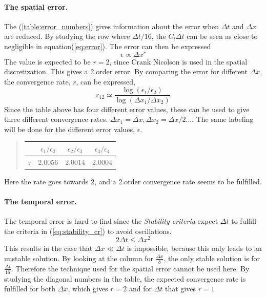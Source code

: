 \documentclass[%
twoside,                 %
final,                   %
10pt]{article}
\begin{document}
\noindent

\paragraph{The spatial error.}
The (\ref{table:error_numbers}) gives information about the error when $\Delta t$ and $\Delta x$ are reduced. By studying the row where $\Delta t/16$, the $C_t \Delta t$ can be seen as close to negligible in equation(\ref{eq:error}). The error can then be expressed 
\begin{equation}
    \epsilon \propto \Delta x^r
\end{equation}
The value is expected to be $r=2$, since Crank Nicolson is used in the spatial discretization. This gives a 2.order error. By comparing the error for different $\Delta x$, the convergence rate, $r$, can be expressed, 
\begin{equation} \label{eq:conv_rate}
 r_{12} \simeq \frac{\log(\epsilon_1/\epsilon_2)}{\log(\Delta x_1/\Delta x_2)}
\end{equation}
Since the table above has four different error values, these can be used to give three different convergence rates. $\Delta x_1 = \Delta x, \Delta x_2 = \Delta x/2...$. The same labeling will be done for the different error values, $\epsilon$.

\begin{quote}
\begin{tabular}{cccc}
\hline
\multicolumn{1}{c}{  } & \multicolumn{1}{c}{ $\epsilon_1/\epsilon_2$ } & \multicolumn{1}{c}{ $\epsilon_2/\epsilon_3$ } & \multicolumn{1}{c}{ $\epsilon_3/\epsilon_4$ } \\
\hline
r                       & 2.0056                  & 2.0014                  & 2.0004                  \\
\hline
\end{tabular}
\end{quote}

\noindent
Here the rate goes towards 2, and a 2.order convergence rate seems to be fulfilled.
\paragraph{The temporal error.}
The temporal error is hard to find since the \emph{Stability criteria} expect $\Delta t$ to fulfill the criteria in (\ref{eq:stability_cr}) to avoid oscillations.
\begin{equation} \label{eq:stability_cr}
 2\Delta t \leq \Delta x^2
\end{equation}
This results in the case that $\Delta x \ll \Delta t$ is impossible, because this only leads to an unstable solution. By looking at the column for $\frac{\Delta x}{8}$, the only stable solution is for $\frac{\Delta t}{16}$. Therefore the technique used for the spatial error cannot be used here. By studying the diagonal numbers in the table, the expected convergence rate is fulfilled for both $\Delta x$, which gives $r = 2$ and for $\Delta t$ that gives $r=1$   
\end{document}
